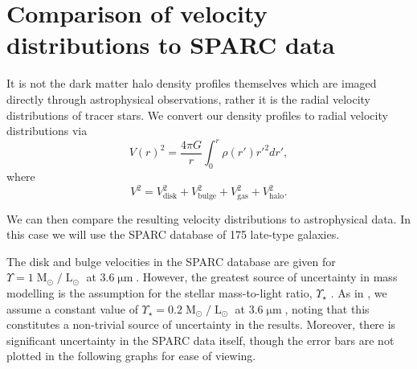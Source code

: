 \documentclass[a4paper,11pt]{article}
\begin{document}
\section{Comparison of velocity distributions to SPARC data}\label{sec:velocity}

It is not the dark matter halo density profiles themselves which are imaged directly through astrophysical observations, rather it is the radial velocity distributions of tracer stars. We convert our density profiles to radial velocity distributions \cite{Sofue:2008wt} via 
%
\begin{equation}
    V(r)^2 = \frac{4\pi G}{r}\int_0^r \rho(r')r'^2 dr',
\end{equation}
where 
\begin{equation}
    V^2 = V_{\mathrm{disk}}^2 + V_{\mathrm{bulge}}^2 + V_{\mathrm{gas}}^2 + V_{\mathrm{halo}}^2.
\end{equation}
%

We can then compare the resulting velocity distributions to astrophysical data. In this case we will use the SPARC database of 175 late-type galaxies.

The disk and bulge velocities in the SPARC database are given for $\Upsilon = 1 \operatorname{M}_{\odot}/\operatorname{L}_{\odot}$ at $3.6\operatorname{\mu m}$. However, the greatest source of uncertainty in mass modelling is the assumption for the stellar mass-to-light ratio, $\Upsilon_\star$ \cite{Lelli:2016zqa}. As in \cite{Robles:2018fur}, we  assume a constant value of $\Upsilon_\star = 0.2 \operatorname{M}_{\odot}/\operatorname{L}_{\odot}$ at $3.6\operatorname{\mu m}$, noting that  this constitutes a non-trivial source of uncertainty in the results. Moreover, there is significant uncertainty in the SPARC data itself, though the error bars are not plotted in the following graphs for ease of viewing. 
\end{document}
